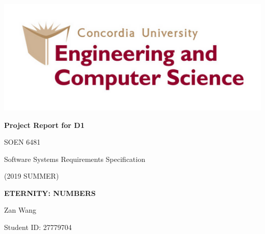 \begin{titlepage}

\begin{center}
    \includegraphics[width=15cm]{images/u_logo.png} \\
    \vspace{24mm}
  
    
    {\fontsize{18}{20}
    \selectfont \textbf{Project Report for D1}} \\
    
    \vspace{8mm}             
    
    {\fontsize{14}{16}
    \selectfont SOEN 6481}
    
    {\fontsize{14}{16}
    \selectfont Software Systems Requirements Specification}
    
    {\fontsize{14}{16}
    \selectfont (2019 SUMMER)}\\
    
    \vspace{8mm}
    
    {\fontsize{18}{20}
    \selectfont \textbf{ETERNITY: NUMBERS}} \\
    
    \vspace{8mm}

    
    \vspace{8mm}
    
    {\fontsize{14}{16}
    \selectfont Zan Wang} \\
    
    
    
    \vspace{8mm}
    
    {\fontsize{12}{10} \selectfont Student ID: 27779704 } \\
    

    
\end{center}

\end{titlepage}
